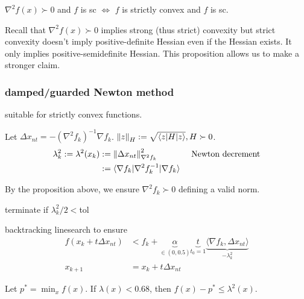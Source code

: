 \documentclass[class=article,crop=false]{standalone}
\begin{document}
\begin{prop}
	$ \nabla ^2 f(x) \succ 0 $ and $ f$ is sc  $ \iff$ $ f$ is strictly convex and  $ f$ is sc. 
\end{prop}
\begin{remark}
	Recall that $ \nabla ^2 f(x) \succ 0$ implies strong (thus strict) convexity but strict convexity doesn't imply positive-definite Hessian even if the Hessian exists. It only implies positive-semidefinite Hessian. This proposition allows us to make a stronger claim.
\end{remark}
\subsubsection{damped/guarded Newton method}
suitable for strictly convex functions.

Let $ \Delta x_{nt} = -(\nabla ^2 f_k)^{-1} \nabla f_k$. $ {\left\lVert{ z}\right\rVert}_{H} := \sqrt{\langle z|H|z \rangle}  , H \succ 0$.
\begin{align*}
	\lambda_k^2 := \lambda^2(x_k) &:= {\left\lVert{ \Delta x_{nt}}\right\rVert}_{\nabla ^2 f_k}^2 && \text{ Newton decrement} \\
	&:= \langle \nabla f_k| \nabla ^2 f_k^{-1}|\nabla f_k \rangle 
\end{align*}
\begin{remark}
By the proposition above, we ensure $ \nabla ^2 f_k \succ 0$ defining a valid norm.
\end{remark}
terminate if $ \lambda_k^2 /2<$tol

backtracking linesearch to ensure
\begin{align*}
	f(x_k + t \Delta x_{nt}) &< f_k + \underbrace{ \alpha}_{ \in (0,0.5)} \underbrace{ t}_{ t_0=1}  \underbrace{  \langle \nabla f_k, \Delta x_{nt} \rangle}_{ -\lambda_k ^2}\\
	x_{k+1} &= x_k+ t \Delta x_{nt}
\end{align*}

\begin{prop}[BV Ch. 9.6.3]
	Let $ p^*  = \min_{x } f(x)$. If $ \lambda(x) < 0.68$, then $ f(x)-p^* \leq \lambda^2(x)$.
\end{prop}
\end{document}
